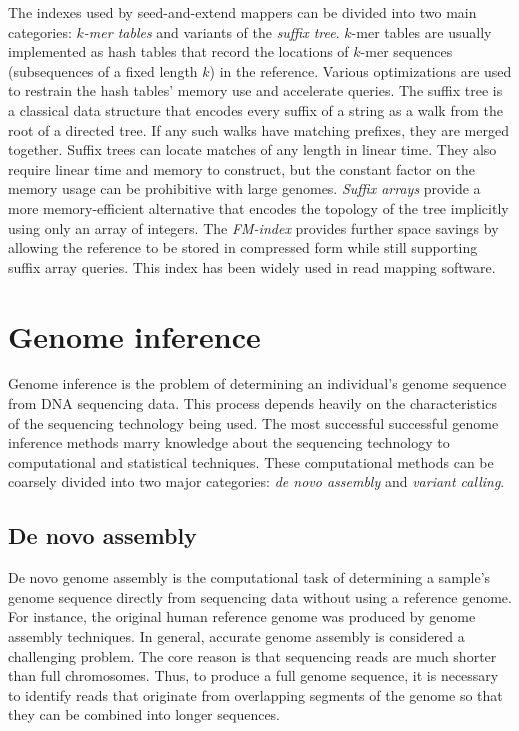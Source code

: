 \documentclass[11pt]{ucthesis}
\begin{document}
The indexes used by seed-and-extend mappers can be divided into two main categories: \emph{$k$-mer tables} and variants of the  \emph{suffix tree}. $k$-mer tables are usually implemented as hash tables that record the locations of $k$-mer sequences (subsequences of a fixed length $k$) in the reference\cite{li2008mapping,li2018minimap2}. Various optimizations are used to restrain the hash tables' memory use and accelerate queries\cite{roberts2004reducing,edgar2021syncmers}. The suffix tree is a classical data structure that encodes every suffix of a string as a walk from the root of a directed tree. If any such walks have matching prefixes, they are merged together. Suffix trees can locate matches of any length in linear time. They also require linear time and memory to construct\cite{ukkonen1995line}, but the constant factor on the memory usage can be prohibitive with large genomes\cite{kurtz2004versatile}.  \emph{Suffix arrays} provide a more memory-efficient alternative that encodes the topology of the tree implicitly using only an array of integers\cite{manber1993suffix}. The  \emph{FM-index} provides further space savings by allowing the reference to be stored in compressed form while still supporting suffix array queries\cite{ferragina2000opportunistic}. This index has been widely used in read mapping software\cite{li2013aligning,langmead2012fast}. 

\section{Genome inference}

Genome inference is the problem of determining an individual's genome sequence from DNA sequencing data. This process depends heavily on the characteristics of the sequencing technology being used. The most successful successful genome inference methods marry knowledge about the sequencing technology to computational and statistical techniques. These computational methods can be coarsely divided into two major categories: \emph{de novo assembly} and \emph{variant calling}.

\subsection{De novo assembly}

De novo genome assembly is the computational task of determining a sample's genome sequence directly from sequencing data without using a reference genome. For instance, the original human reference genome was produced by genome assembly techniques. In general, accurate genome assembly is considered a challenging problem. The core reason is that sequencing reads are much shorter than full chromosomes. Thus, to produce a full genome sequence, it is necessary to identify reads that originate from overlapping segments of the genome so that they can be combined into longer sequences.
\end{document}
